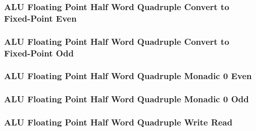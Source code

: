 

\subsubsection[{\small ALU Floating Point Half Word Quadruple Convert to Fixed-Point Even}]{ALU Floating Point Half Word Quadruple Convert to Fixed-Point Even} \label{sec:format-ALU-FHQFIXEDE}



\subsubsection[{\small ALU Floating Point Half Word Quadruple Convert to Fixed-Point Odd}]{ALU Floating Point Half Word Quadruple Convert to Fixed-Point Odd} \label{sec:format-ALU-FHQFIXEDO}



\subsubsection[{\small ALU Floating Point Half Word Quadruple Monadic 0 Even}]{ALU Floating Point Half Word Quadruple Monadic 0 Even} \label{sec:format-ALU-FHQMO0E}



\subsubsection[{\small ALU Floating Point Half Word Quadruple Monadic 0 Odd}]{ALU Floating Point Half Word Quadruple Monadic 0 Odd} \label{sec:format-ALU-FHQMO0O}



\subsubsection[{\small ALU Floating Point Half Word Quadruple Write Read}]{ALU Floating Point Half Word Quadruple Write Read} \label{sec:format-ALU-FHQWR}

